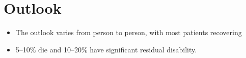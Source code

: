 \section{Outlook}
\begin{itemize}[noitemsep]
  \item The outlook varies from person to person, with most patients recovering
  \item 5--10\% die and 10--20\% have significant residual disability.
\end{itemize}
